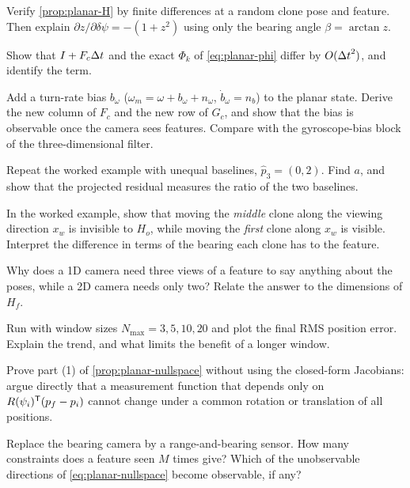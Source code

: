 \begin{exercises}
  \item Verify \cref{prop:planar-H} by finite differences at a random clone pose and feature. Then explain $\partial z/\partial\delta\psi = -(1 + z^2)$ using
        only the bearing angle $\beta = \arctan z$.
  \item Show that $I + F_c{\Delta t}$ and the exact $\Phi_k$ of \eqref{eq:planar-phi} differ by $O({\Delta t}^2)$, and identify the term.
  \item Add a turn-rate bias $b_\omega$ ($\omega_m = \omega + b_\omega + n_\omega$, $\dot b_\omega = n_b$) to the planar state. Derive the new column of $F_c$ and the new
        row of $G_c$, and show that the bias is observable once the camera sees features. Compare with the gyroscope-bias block of the
        three-dimensional filter.
  \item Repeat the worked example with unequal baselines, $\hat p_3 = (0, 2)$. Find $a$, and show that the projected residual measures the
        ratio of the two baselines.
  \item In the worked example, show that moving the \emph{middle} clone along the viewing direction $x_w$ is invisible to $H_o$, while moving the
        \emph{first} clone along $x_w$ is visible. Interpret the difference in terms of the bearing each clone has to the feature.
  \item Why does a 1D camera need three views of a feature to say anything about the poses, while a 2D camera needs only two? Relate the answer
        to the dimensions of $H_f$.
  \item Run  with window sizes $N_{\max} = 3, 5, 10, 20$ and plot the final RMS position error. Explain the trend, and what
        limits the benefit of a longer window.
  \item Prove part (1) of \cref{prop:planar-nullspace} without using the closed-form Jacobians: argue directly that a measurement function that depends only
        on $R(\psi_i)^{\mathsf{T}}(p_f - p_i)$ cannot change under a common rotation or translation of all positions.
  \item Replace the bearing camera by a range-and-bearing sensor. How many constraints does a feature seen $M$ times give? Which of the unobservable
        directions of \eqref{eq:planar-nullspace} become observable, if any?
\end{exercises}

